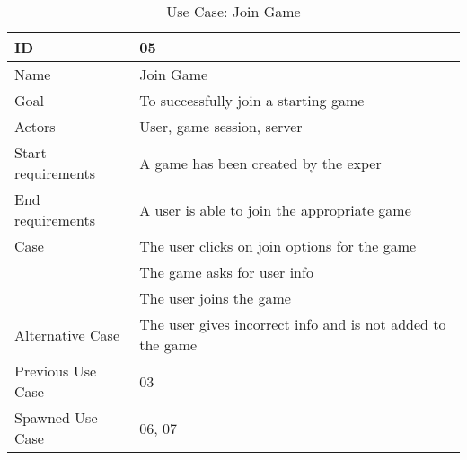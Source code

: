 \begin{table}[H]
\begin{tabular}{|l|l|}
\hline
	ID & 05\\ \hline
	Name & Join Game\\ \hline
	Goal & To successfully join a starting game\\ \hline
	Actors & User, game session, server \\ \hline
	Start requirements & A game has been created by the exper\\ \hline
	End requirements & A user is able to join the appropriate game\\ \hline
	Case & The user clicks on join options for the game\\
			& The game asks for user info \\
			& The user joins the game \\ \hline
	Alternative Case & The user gives incorrect info and is not added to the game \\ \hline
	Previous Use Case & 03 \\ \hline
	Spawned Use Case & 06, 07\\ \hline
\end{tabular}
\caption{Use Case: Join Game}
\label{fig:usecase05table}
\end{table}




